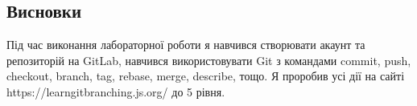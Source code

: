 \documentclass[oneside,14pt]{extarticle}
\begin{document}
\begin{normalsize}
	\section*{Висновки}
	Під час виконання лабораторної роботи я навчився створювати акаунт та репозиторій на GitLab, навчився використовувати Git з командами commit, push, checkout, branch, tag, rebase, merge, describe, тощо. Я проробив усі дії на сайті https://learngitbranching.js.org/ до 5 рівня.
	    
\end{normalsize}
\end{document}

